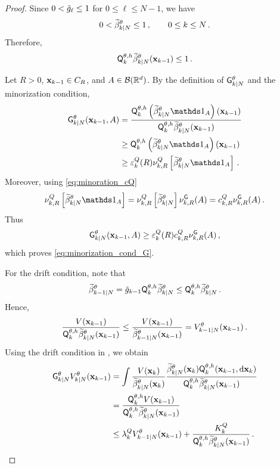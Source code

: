 \documentclass[11pt]{article}
\theoremstyle{plain}
\theoremstyle{definition}
\theoremstyle{remark}
\begin{document}
\begin{proof}
Since $0 < \potnorm{\ell} \le 1$ for $0\le \ell \le N-1$, we have
$$
0 < \widetilde \beta_{k|N}^{\theta} \le 1 \,, \qquad 0 \le k\le N \,.
$$
Therefore,
$$
\mk{k}[\theta,h] \widetilde \beta_{k|N}^{\theta}(\x_{k-1}) \le 1 \eqsp.
$$

Let $R>0$, $\mathbf{x}_{k-1}\in C_R$, and $A\in\mathcal{B}(\mathbb{R}^d)$. By the definition of $\fsmk{k}{N}[\theta]$ and the minorization condition,
\begin{align*}
\fsmk{k}{N}[\theta][\x_{k-1}][A]
&= \frac{ \mk{k}[\theta,h] \left( \widetilde \beta_{k|N}^{\theta} \un_A \right)(\x_{k-1}) }{ \mk{k}[\theta,h] \widetilde \beta_{k|N}^{\theta} (\x_{k-1}) } \\
& \ge \mk{k}[\theta,h] \left( \widetilde \beta_{k|N}^{\theta} \un_A \right) (\x_{k-1}) \\
&\ge \varepsilon_k^Q(R) \nu_{k,R}^Q \left[ \widetilde \beta_{k|N}^{\theta} \un_A \right] \eqsp.
\end{align*}
Moreover, using \eqref{eq:minoration_cQ}
$$
\nu_{k,R}^Q \left[ \widetilde \beta_{k|N}^{\theta}\un_A \right]
= \nu_{k,R}^Q \left[ \widetilde \beta_{k|N}^{\theta} \right] \nu_{k,R}^{\mathsf G}(A)
= c_{k,R}^Q \nu_{k,R}^{\mathsf G}(A) \eqsp.
$$
Thus
$$
\fsmk{k}{N}[\theta][\x_{k-1}][A] \ge \varepsilon^Q_k(R)c_{k,R}^Q \nu_{k,R}^{\mathsf G}(A) \eqsp,
$$
which proves \eqref{eq:minorization_cond_G}.

For the drift condition, note that
\begin{equation} \label{eq:recursion_beta_tilde}
\widetilde \beta_{k-1|N}^{\theta} = \potnorm{k-1} \mk{k}[\theta,h] \widetilde \beta_{k|N}^{\theta} \le \mk{k}[\theta,h] \widetilde \beta_{k|N}^{\theta} \eqsp.
\end{equation}
Hence,
$$
\frac{ V(\x_{k-1}) }{ \mk{k}[\theta,h] \widetilde \beta_{k|N}^{\theta} (\x_{k-1}) } \le \frac{ V(\x_{k-1}) }{ \widetilde \beta_{k-1|N}^{\theta} (\x_{k-1}) } = V_{k-1|N}^{\theta}(\x_{k-1}) \eqsp.
$$
Using the drift condition in , we obtain
\begin{align*}
\fsmk{k}{N}[\theta]V_{k|N}^{\theta}(\x_{k-1})
&= \int \frac{ V(\x_k) }{ \widetilde \beta_{k|N}^{\theta}(\x_k) }
\frac{ \widetilde \beta_{k|N}^{\theta}(\x_k) \mk{k}[\theta,h][\x_{k-1}][\rmd \x_k] }{ \mk{k}[\theta,h] \widetilde \beta_{k|N}^{\theta}(\x_{k-1}) } \\
&= \frac{ \mk{k}[\theta,h]V(\x_{k-1}) }{ \mk{k}[\theta,h] \widetilde \beta_{k|N}^{\theta}(\x_{k-1}) } \\
&\le \lambda_k^Q V_{k-1|N}^{\theta} (\x_{k-1}) + \frac{ K_k^Q }{ \mk{k}[\theta,h] \widetilde \beta_{k|N}^{\theta}(\x_{k-1}) } \eqsp.
\end{align*}


\end{proof}
\end{document}
